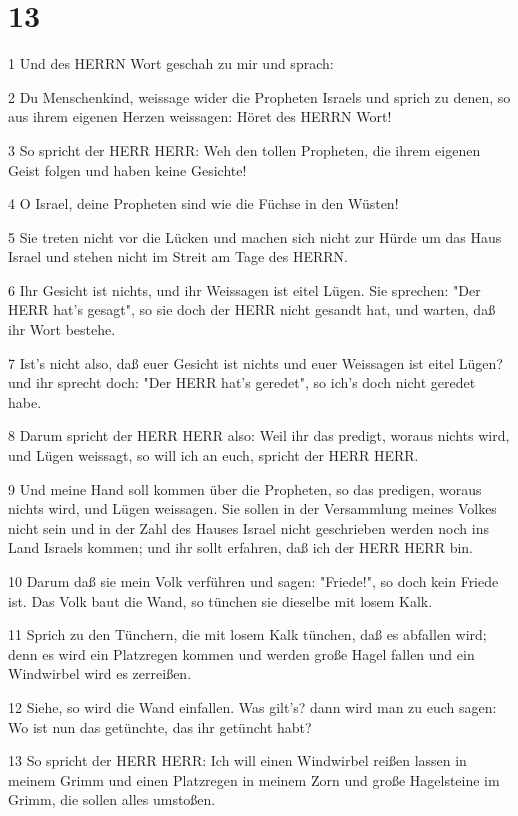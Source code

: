 \chapter{13}

\par 1 Und des HERRN Wort geschah zu mir und sprach:
\par 2 Du Menschenkind, weissage wider die Propheten Israels und sprich zu denen, so aus ihrem eigenen Herzen weissagen: Höret des HERRN Wort!
\par 3 So spricht der HERR HERR: Weh den tollen Propheten, die ihrem eigenen Geist folgen und haben keine Gesichte!
\par 4 O Israel, deine Propheten sind wie die Füchse in den Wüsten!
\par 5 Sie treten nicht vor die Lücken und machen sich nicht zur Hürde um das Haus Israel und stehen nicht im Streit am Tage des HERRN.
\par 6 Ihr Gesicht ist nichts, und ihr Weissagen ist eitel Lügen. Sie sprechen: "Der HERR hat's gesagt", so sie doch der HERR nicht gesandt hat, und warten, daß ihr Wort bestehe.
\par 7 Ist's nicht also, daß euer Gesicht ist nichts und euer Weissagen ist eitel Lügen? und ihr sprecht doch: "Der HERR hat's geredet", so ich's doch nicht geredet habe.
\par 8 Darum spricht der HERR HERR also: Weil ihr das predigt, woraus nichts wird, und Lügen weissagt, so will ich an euch, spricht der HERR HERR.
\par 9 Und meine Hand soll kommen über die Propheten, so das predigen, woraus nichts wird, und Lügen weissagen. Sie sollen in der Versammlung meines Volkes nicht sein und in der Zahl des Hauses Israel nicht geschrieben werden noch ins Land Israels kommen; und ihr sollt erfahren, daß ich der HERR HERR bin.
\par 10 Darum daß sie mein Volk verführen und sagen: "Friede!", so doch kein Friede ist. Das Volk baut die Wand, so tünchen sie dieselbe mit losem Kalk.
\par 11 Sprich zu den Tünchern, die mit losem Kalk tünchen, daß es abfallen wird; denn es wird ein Platzregen kommen und werden große Hagel fallen und ein Windwirbel wird es zerreißen.
\par 12 Siehe, so wird die Wand einfallen. Was gilt's? dann wird man zu euch sagen: Wo ist nun das getünchte, das ihr getüncht habt?
\par 13 So spricht der HERR HERR: Ich will einen Windwirbel reißen lassen in meinem Grimm und einen Platzregen in meinem Zorn und große Hagelsteine im Grimm, die sollen alles umstoßen.
